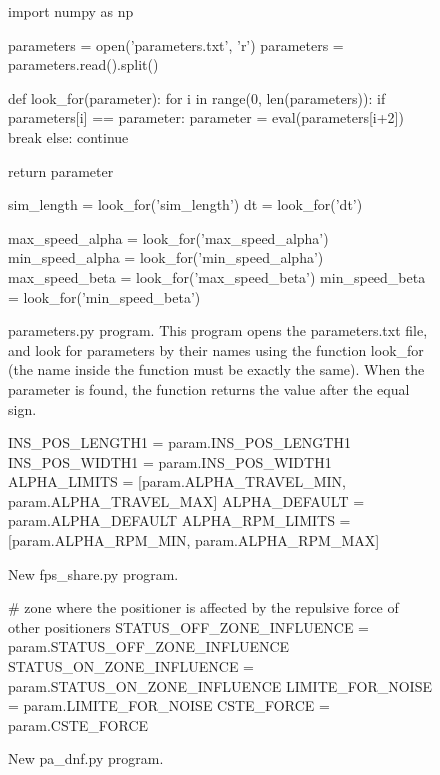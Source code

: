 \begin{figure}[h]
\begin{center}
	\scriptsize{
	\begin{python}
import numpy as np

parameters = open('parameters.txt', 'r')
parameters = parameters.read().split()

def look_for(parameter):
    for i in range(0, len(parameters)):
        if parameters[i] == parameter:
            parameter = eval(parameters[i+2])
            break
        else:
            continue

    return parameter

sim_length = look_for('sim_length')
dt = look_for('dt')

max_speed_alpha = look_for('max_speed_alpha')
min_speed_alpha = look_for('min_speed_alpha')
max_speed_beta = look_for('max_speed_beta')
min_speed_beta = look_for('min_speed_beta')
	\end{python}
	}
	\caption{parameters.py program. This program opens the parameters.txt file, and look for parameters by their names using the function look_for (the name inside the function must be exactly the same). When the parameter is found, the function returns the value after the equal sign.}
	\label{}
\end{center}
\end{figure}


\begin{figure}[h]
\begin{center}
	\scriptsize{
	\begin{python}
INS_POS_LENGTH1 = param.INS_POS_LENGTH1
INS_POS_WIDTH1 = param.INS_POS_WIDTH1
ALPHA_LIMITS = [param.ALPHA_TRAVEL_MIN, param.ALPHA_TRAVEL_MAX]
ALPHA_DEFAULT = param.ALPHA_DEFAULT
ALPHA_RPM_LIMITS = [param.ALPHA_RPM_MIN, param.ALPHA_RPM_MAX]
	\end{python}
	}
	\caption{New fps_share.py program.}
	\label{}
\end{center}
\end{figure}


\begin{figure}[h]
\begin{center}
	\scriptsize{
	\begin{python}
# zone where the positioner is affected by the repulsive force of other positioners
STATUS_OFF_ZONE_INFLUENCE = param.STATUS_OFF_ZONE_INFLUENCE
STATUS_ON_ZONE_INFLUENCE = param.STATUS_ON_ZONE_INFLUENCE
LIMITE_FOR_NOISE = param.LIMITE_FOR_NOISE 
CSTE_FORCE = param.CSTE_FORCE
	\end{python}
	}
	\caption{New pa_dnf.py program.}
	\label{}
\end{center}
\end{figure}


